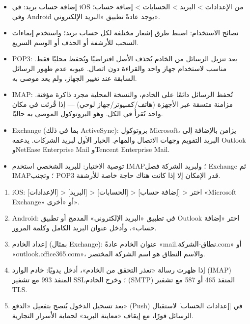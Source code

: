 
\begin{itemize}
  \item إضافة حساب بريد: في iOS من الإعدادات > البريد > الحسابات > إضافة حساب؛ وفي Android يوجد عادةً تطبيق «البريد الإلكتروني».
  \item نصائح الاستخدام: اضبط طرق إشعار مختلفة لكل حساب بريد؛ واستخدم إيماءات السحب للأرشفة أو الحذف أو الوسم السريع.
\end{itemize}


\begin{itemize}
  \item POP3: بعد تنزيل الرسائل من الخادم يُحذف الأصل افتراضيًا ويُحفظ محليًا فقط. مناسب لاستخدام جهاز واحد والقراءة دون اتصال. عيوبه عدم ظهور الرسائل السابقة عند تغيير الجهاز، ولم يعد موصى به.
  \item IMAP: تُحفظ الرسائل دائمًا على الخادم، والنسخة المحلية مجرد ذاكرة مؤقتة. مزامنة متسقة عبر الأجهزة (هاتف/كمبيوتر/جهاز لوحي) — إذا قُرئت في مكان واحد تُقرأ في الكل. وهو البروتوكول الموصى به حاليًا.
  \item Exchange (بما في ذلك ActiveSync): بروتوكول Microsoft، يزامن بالإضافة إلى البريد التقويم وجهات الاتصال والمهام. الخيار الأول لبريد الشركات. يدعمه Outlook وNetEase Enterprise Mail وTencent Enterprise Mail.
  \item توصية الاختيار: للبريد الشخصي استخدم IMAP؛ ولبريد الشركة فضل Exchange ثم IMAP؛ وتجنب POP3 قدر الإمكان إلا إذا كانت هناك حاجة خاصة للأرشفة.
\end{itemize}


\begin{enumerate}
  \item iOS: [الإعدادات] > [البريد] > [الحسابات] > [إضافة حساب] > اختر «Microsoft Exchange» أو «أخرى».
  \item Android: في تطبيق «البريد الإلكتروني» المدمج أو تطبيق Outlook اختر «إضافة حساب»، وأدخل عنوان البريد الكامل وكلمة المرور.
  \item إعداد الخادم (بمثال Exchange): عنوان الخادم عادةً «mail.نطاق-الشركة.com» أو «outlook.office365.com»، والاسم النطاق هو اسم الشركة المختصر.
  \item إذا ظهرت رسالة «تعذر التحقق من الخادم»، أدخل يدويًا: خادم الوارد (IMAP) المنفذ 993 مع تشفير SSL؛ وخرج الخادم (SMTP) المنفذ 465 أو 587 مع تشفير TLS.
  \item بعد تسجيل الدخول يُنصح بتفعيل «الدفع» (Push) في [إعدادات الحساب] لاستقبال الرسائل فورًا، مع إيقاف «معاينة البريد» لحماية الأسرار التجارية.
\end{enumerate}

